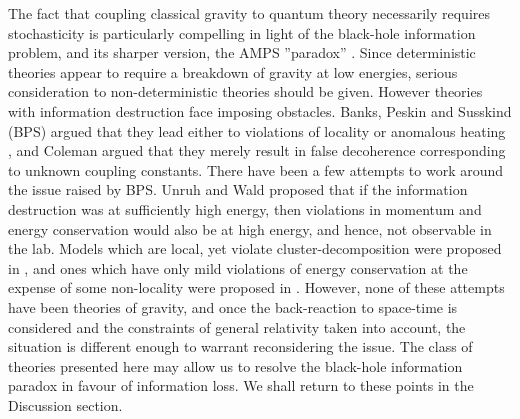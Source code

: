 \documentclass[aps,pra,showpacs,citeautoscript,amsmath,amssymb,floatfix,superscriptaddress,bbm, verbatim,amsfonts,changes,10pt,nofootinbib,longbibliography]{revtex4-1}
\begin{document}
The fact that coupling classical gravity to quantum theory necessarily requires stochasticity\cite{stochasticity_foot} %
 is particularly compelling in light of the black-hole information problem\cite{hawking-bhinfoloss,hawking-unpredictability,preskill-infoloss-note}, and its sharper version, the AMPS ''paradox'' \cite{almheiri2013black,braunstein2009entangled}. Since deterministic theories appear to require a breakdown of gravity at low energies\cite{energies_foot}, serious consideration to non-deterministic theories should be given\cite{ellis1984search}. However theories with information destruction face imposing obstacles. \label{par:introchallenge} Banks, Peskin and Susskind (BPS) argued that they lead either to violations of locality or anomalous heating
\cite{bps,gross1984quantum}, and Coleman argued that they merely result in false decoherence corresponding to unknown coupling constants\cite{coleman1988black}. 
\label{par:ibps}There have been a few attempts to work around the issue raised by BPS. 
Unruh and Wald proposed that if the
information destruction was at sufficiently high energy, then violations in momentum and energy conservation 
would also be at high energy, and hence, not observable in the lab\cite{unruh-wald-onbps}. Models which are local, yet violate 
cluster-decomposition\cite{cluster_foot}
were proposed in \cite{OR-intrinsic}, and ones which have only mild violations of energy conservation at the expense of some non-locality were proposed in \cite{poulinKITP}. 
However, none of these attempts have been theories of gravity, and once the back-reaction to space-time is considered and the constraints of general relativity taken into account, the situation is different enough to warrant reconsidering the issue. The class of theories presented here may allow us to resolve the black-hole information paradox in favour of information loss. We shall return to these points in the Discussion section.
\end{document}
